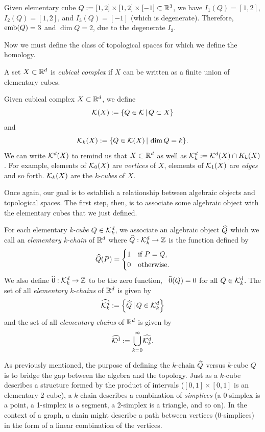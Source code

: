 \begin{exmp} \label{ex:embvsdim}
	Given elementary cube $Q := [1,2] \times [1,2] \times [-1] \subset \mathbb{R}^3$, we have $I_1(Q) = [1,2]$, $I_2(Q) = [1,2]$, and $I_3(Q) = [-1]$ (which is degenerate). Therefore, $\mathord{\mathrm{emb}(Q)} = 3$ and $\dim{Q} = 2$, due to the degenerate $I_3$.
\end{exmp}

Now we must define the class of topological spaces for which we define the homology.

\begin{defn}
	A set $X \subset \mathbb{R}^d$ is \textit{cubical complex} if $X$ can be written as a finite union of elementary cubes.
\end{defn}

Given cubical complex $X \subset \mathbb{R}^d$, we define
	$$ \mathcal{K}(X) := \{ Q \in \mathcal{K} \, | \, Q \subset X \} $$ and
	$$ \mathcal{K}_k (X) := \{ Q \in \mathcal{K} (X) \, | \, \dim{Q} = k \}. $$
We can write $\mathcal{K}^{d} (X)$ to remind us that $X \subset \mathbb{R}^d$ as well as $\mathcal{K}^{d}_k := \mathcal{K}^{d}(X) \cap K_k(X)$. For example, elements of $\mathcal{K}_0(X)$ are \textit{vertices} of $X$, elements of $\mathcal{K}_1(X)$ are \textit{edges} and so forth. $\mathcal{K}_k(X)$ are the \textit{k-cubes} of $X$.

Once again, our goal is to establish a relationship between algebraic objects and topological spaces. The first step, then, is to associate some algebraic object with the elementary cubes that we just defined.
%
\begin{defn}
	For each elementary \textit{k-cube} $Q \in \mathcal{K}^{d}_k$, we associate an algebraic object $\widehat{Q}$ which we call an \textit{elementary k-chain} of $\mathbb{R}^d$ where $\widehat{Q} : \mathcal{K}^{d}_k \rightarrow \mathbb{Z}$ is the function defined by
	$$\widehat{Q}(P) =
		\begin{cases}
			1	& \text{if } P = Q, \\
			0	& \text{otherwise.}
		\end{cases}$$
	We also define $\widehat{0} : \mathcal{K}^{d}_k \rightarrow \mathbb{Z}$ to be the zero function, \ie~$\widehat{0}(Q) = 0$ for all $Q \in \mathcal{K}^{d}_k$.
	The set of all \textit{elementary k-chains} of $\mathbb{R}^d$ is given by
	$$ \widehat{\mathcal{K}^{d}_k} := \left\{ \widehat{Q} \, | \, Q \in \mathcal{K}^{d}_k \right\} $$ and the set of all \textit{elementary chains} of $\mathbb{R}^d$ is given by
	$$ \widehat{\mathcal{K}^{d}} := { \bigcup_{k=0}^{\infty} } \widehat{\mathcal{K}^{d}_k} . $$
\end{defn}

As previously mentioned, the purpose of defining the $k$-chain $\widehat{Q}$ versus $k$-cube $Q$ is to bridge the gap between the algebra and the topology. Just as a $k$-cube describes a structure formed by the product of intervals (\eg $[0,1] \times [0,1]$ is an elementary 2-cube), a $k$-chain describes a combination of \textit{simplices} (a 0-simplex is a point, a 1-simplex is a segment, a 2-simplex is a triangle, and so on). In the context of a graph, a chain might describe a path between vertices (0-simplices) in the form of a linear combination of the vertices.

